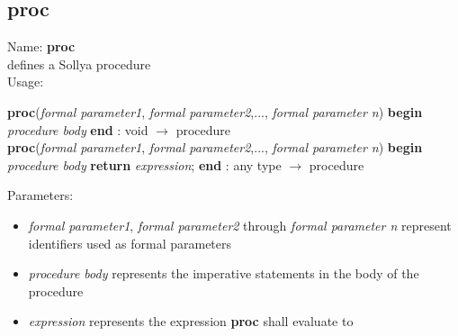 \subsection{proc}
\label{labproc}
\noindent Name: \textbf{proc}\\
defines a Sollya procedure\\

\noindent Usage: 
\begin{center}
\textbf{proc}(\emph{formal parameter1}, \emph{formal parameter2},..., \emph{formal parameter n}) \textbf{begin} \emph{procedure body} \textbf{end} : \textsf{void} $\rightarrow$ \textsf{procedure}\\
\textbf{proc}(\emph{formal parameter1}, \emph{formal parameter2},..., \emph{formal parameter n}) \textbf{begin} \emph{procedure body} \textbf{return} \emph{expression}; \textbf{end} : \textsf{any type} $\rightarrow$ \textsf{procedure}\\
\end{center}
Parameters: 
\begin{itemize}
\item \emph{formal parameter1}, \emph{formal parameter2} through \emph{formal parameter n} represent identifiers used as formal parameters
\item \emph{procedure body} represents the imperative statements in the body of the procedure
\item \emph{expression} represents the expression \textbf{proc} shall evaluate to
\end{itemize}
